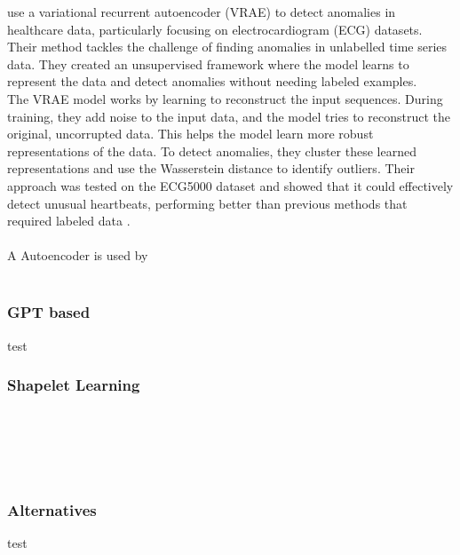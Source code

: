  use a variational recurrent autoencoder (VRAE) to detect anomalies in healthcare data, particularly focusing on electrocardiogram (ECG) datasets. Their method tackles the challenge of finding anomalies in unlabelled time series data. They created an unsupervised framework where the model learns to represent the data and detect anomalies without needing labeled examples.\\
The VRAE model works by learning to reconstruct the input sequences. During training, they add noise to the input data, and the model tries to reconstruct the original, uncorrupted data. This helps the model learn more robust representations of the data. To detect anomalies, they cluster these learned representations and use the Wasserstein distance to identify outliers. Their approach was tested on the ECG5000 dataset and showed that it could effectively detect unusual heartbeats, performing better than previous methods that required labeled data \cite{ramirez_rivera_anomaly_2022}. \\\\
A Autoencoder is used by \cite{pranavan_contrastive_2022} \\\\%

\subsubsection{GPT based}
test
\subsubsection{Shapelet Learning}
\cite{beggel_time_2019}\\\\
\cite{alshaer_detecting_2020}\\\\
\subsubsection{Alternatives}
test
